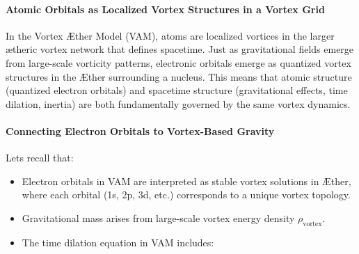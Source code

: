 \paragraph{Atomic Orbitals as Localized Vortex Structures in a Vortex Grid}
In the Vortex Æther Model (VAM), atoms are localized vortices in the larger ætheric vortex network that defines spacetime.
Just as gravitational fields emerge from large-scale vorticity patterns, electronic orbitals emerge as quantized vortex structures in the Æther surrounding a nucleus.
This means that atomic structure (quantized electron orbitals) and spacetime structure (gravitational effects, time dilation, inertia) are both fundamentally governed by the same vortex dynamics.

\paragraph{Connecting Electron Orbitals to Vortex-Based Gravity}
Let\rqs s recall that:
\begin{itemize}
    \item Electron orbitals in VAM are interpreted as stable vortex solutions in Æther, where each orbital (1s, 2p, 3d, etc.) corresponds to a unique vortex topology.
    \item Gravitational mass arises from large-scale vortex energy density $\rho_\text{vortex}$.
    \item The time dilation equation in VAM includes:
\end{itemize}


